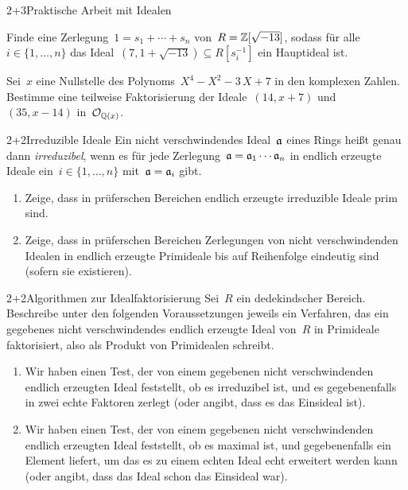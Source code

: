 \documentclass{algblatt}
\begin{document}

\begin{aufgabeE}{2+3}{Praktische Arbeit mit Idealen}
\item Finde eine Zerlegung~$1 = s_1 + \cdots + s_n$ von~$R = \ZZ[\sqrt{-13}]$,
sodass für alle~$i \in \{ 1,\ldots,n \}$ das Ideal~$(7, 1 + \sqrt{-13})
\subseteq R[s_i^{-1}]$ ein Hauptideal ist.
\item Sei~$x$ eine Nullstelle des Polynoms~$X^4-X^2-3\,X+7$ in den
komplexen Zahlen. Bestimme eine teilweise Faktorisierung
der Ideale~$(14,x+7)$ und~$(35,x-14)$ in~$\O_{\QQ(x)}$.
\end{aufgabeE}

\begin{aufgabe}{2+2}{Irreduzible Ideale}
Ein nicht verschwindendes Ideal~$\aa$ eines Rings heißt genau dann
\emph{irreduzibel}, wenn es für jede Zerlegung~$\aa = \aa_1 \cdots \aa_n$ in
endlich erzeugte Ideale ein~$i \in \{1,\ldots,n\}$ mit~$\aa = \aa_i$ gibt.
\begin{enumerate}
\item Zeige, dass in prüferschen Bereichen endlich erzeugte irreduzible Ideale prim sind.
\item Zeige, dass in prüferschen Bereichen Zerlegungen von nicht
verschwindenden Idealen in endlich erzeugte Primideale
bis auf Reihenfolge eindeutig sind (sofern sie existieren).
\end{enumerate}
\end{aufgabe}

\begin{aufgabe}{2+2}{Algorithmen zur Idealfaktorisierung}
Sei~$R$ ein dedekindscher Bereich. Beschreibe unter den folgenden
Voraussetzungen jeweils ein Verfahren, das ein gegebenes nicht verschwindendes
endlich erzeugte Ideal von~$R$ in Primideale faktorisiert, also als Produkt von
Primidealen schreibt.
\begin{enumerate}
\item Wir haben einen Test, der von einem gegebenen nicht verschwindenden endlich erzeugten Ideal feststellt,
ob es irreduzibel ist, und es gegebenenfalls in zwei echte Faktoren zerlegt
(oder angibt, dass es das Einsideal ist).
\item Wir haben einen Test, der von einem gegebenen nicht verschwindenden endlich erzeugten Ideal
feststellt, ob es maximal ist, und gegebenenfalls ein Element liefert, um das
es zu einem echten Ideal echt erweitert werden kann (oder angibt, dass das
Ideal schon das Einsideal war).
\end{enumerate}
\end{aufgabe}
\end{document}
